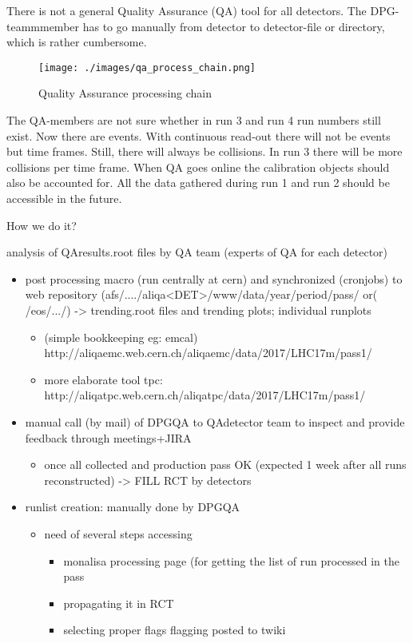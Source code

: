 There is not a general Quality Assurance (QA) tool for all detectors. The DPG-teammmember has to go manually from detector to detector-file or directory, which is rather cumbersome. 

\begin{figure}
  \begin{center}
    \texttt{[image: ./images/qa\_process\_chain.png]}
    \caption{Quality Assurance processing chain}
    \label{fig:}
  \end{center}
\end{figure}

The QA-members are not sure whether in run 3 and run 4 run numbers still exist. Now there are events. With continuous read-out there will not be events but time frames. Still, there will always be collisions. In run 3 there will be more collisions per time frame. When QA goes online the calibration objects should also be accounted for. All the data gathered during run 1 and run 2 should be accessible in the future.

How we do it?

analysis of QAresults.root files by QA team (experts of QA for each detector)
\begin{itemize}
  \item post processing macro (run centrally at cern) and synchronized (cronjobs) to web repository (afs/..../aliqa<DET>/www/data/year/period/pass/ or( /eos/.../) -> trending.root files and trending plots; individual runplots
  \begin{itemize}
    \item (simple bookkeeping eg: emcal) http://aliqaemc.web.cern.ch/aliqaemc/data/2017/LHC17m/pass1/
    \item more elaborate tool tpc: http://aliqatpc.web.cern.ch/aliqatpc/data/2017/LHC17m/pass1/
  \end{itemize}
  \item manual call (by mail) of DPGQA to QAdetector team to inspect and provide feedback through meetings+JIRA
  \begin{itemize}
    \item once all collected and production pass OK (expected 1 week after all runs reconstructed) -> FILL RCT by detectors
  \end{itemize}
  \item runlist creation: manually done by DPGQA
    \begin{itemize}
    \item need of several steps accessing
      \begin{itemize}
      \item monalisa processing page (for getting the list of run processed in the pass
      \item propagating it in RCT
      \item selecting proper flags flagging posted to twiki
      \end{itemize}
  \end{itemize}
\end{itemize}

